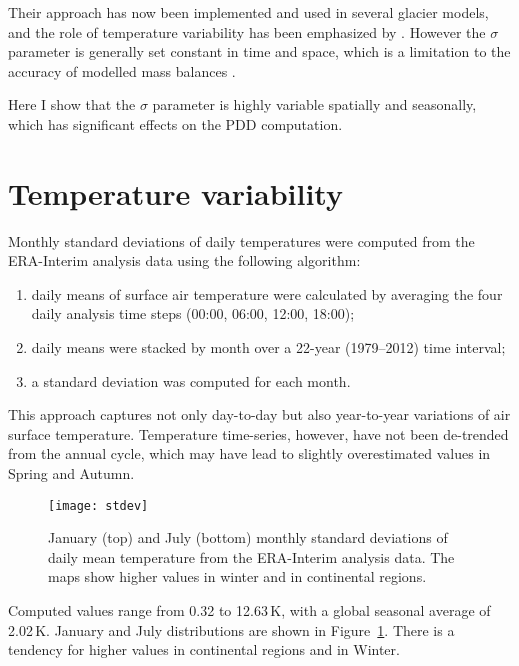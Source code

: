 \documentclass[twocolumn]{igs}
\begin{document}
Their approach has now been implemented and used in several glacier models, and the role of temperature variability has been emphasized by \citet{charbit-etal-2012}. However the $\sigma$ parameter is generally set constant in time and space, which is a limitation to the accuracy of modelled mass balances \citep{charbit-etal-2012}.

Here I show that the $\sigma$ parameter is highly variable spatially and seasonally, which has significant effects on the PDD computation.


\section{Temperature variability}

Monthly standard deviations of daily temperatures were computed from the ERA-Interim \citep{data:erai} analysis data using the following algorithm:

\begin{enumerate}
  \item daily means of surface air temperature were calculated by averaging the four daily analysis time steps (00:00, 06:00, 12:00, 18:00);
  \item daily means were stacked by month over a 22-year (1979--2012) time interval;
  \item a standard deviation was computed for each month.
\end{enumerate}

This approach captures not only day-to-day but also year-to-year variations of air surface temperature. Temperature time-series, however, have not been de-trended from the annual cycle, which may have lead to slightly overestimated values in Spring and Autumn.

\begin{figure}
  \centering\texttt{[image: stdev]}
  \caption{January (top) and July (bottom) monthly standard deviations of daily mean temperature from the ERA-Interim analysis data. The maps show higher values in winter and in continental regions.}
  \label{fig:stdev}
\end{figure}

Computed values range from 0.32 to 12.63\,K, with a global seasonal average of 2.02\,K. January and July distributions are shown in Figure~\ref{fig:stdev}. There is a tendency for higher values in continental regions and in Winter.
\end{document}
